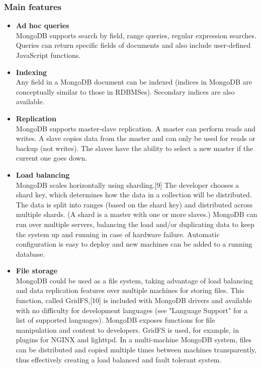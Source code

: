 \subsubsection{Main features}

\begin{itemize}

\item \textbf{Ad hoc queries} \\
MongoDB supports search by field, range queries, regular expression searches. Queries can return specific fields of documents and also include user-defined JavaScript functions.

\item \textbf{Indexing} \\
Any field in a MongoDB document can be indexed (indices in MongoDB are conceptually similar to those in RDBMSes). Secondary indices are also available.

\item \textbf{Replication} \\
MongoDB supports master-slave replication. A master can perform reads and writes. A slave copies data from the master and can only be used for reads or backup (not writes). The slaves have the ability to select a new master if the current one goes down.

\item \textbf{Load balancing} \\
MongoDB scales horizontally using sharding.[9] The developer chooses a shard key, which determines how the data in a collection will be distributed. The data is split into ranges (based on the shard key) and distributed across multiple shards. (A shard is a master with one or more slaves.)
MongoDB can run over multiple servers, balancing the load and/or duplicating data to keep the system up and running in case of hardware failure. Automatic configuration is easy to deploy and new machines can be added to a running database.

\item \textbf{File storage} \\
MongoDB could be used as a file system, taking advantage of load balancing and data replication features over multiple machines for storing files.
This function, called GridFS,[10] is included with MongoDB drivers and available with no difficulty for development languages (see "Language Support" for a list of supported languages). MongoDB exposes functions for file manipulation and content to developers. GridFS is used, for example, in plugins for NGINX and lighttpd. In a multi-machine MongoDB system, files can be distributed and copied multiple times between machines transparently, thus effectively creating a load balanced and fault tolerant system.


\end{itemize}
